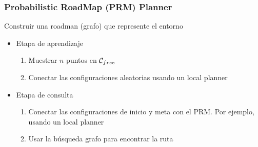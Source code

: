 \begin{frame}
	\frametitle{Probabilistic RoadMap (PRM) Planner}
	
	Construir una roadman (grafo) que represente el entorno
	\begin{itemize}
		\item Etapa de aprendizaje
		\begin{enumerate}
			\item Muestrar $n$ puntos en $\mathcal{C}_{free}$
			\item Conectar las configuraciones aleatorias usando un local planner
		\end{enumerate}
		\item Etapa de consulta
		\begin{enumerate}
			\item Conectar las configuraciones de inicio y meta con el PRM. Por ejemplo, usando un local planner
			\item Usar la búsqueda grafo para encontrar la ruta
		\end{enumerate}
	\end{itemize}
\end{frame}


